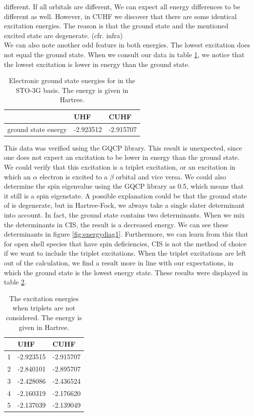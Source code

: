different. If all orbitals are different, We can expect all energy differences to be different as well. However, in CUHF we discover that there are some identical
excitation energies. The reason is that the ground state and the mentioned excited state are degenerate. (cfr. infra)\\
We can also note another odd feature in both energies. The lowest excitation does not equal the ground state. When we consult our data in table
\ref{tab:ground states}, we notice that the lowest excitation is lower in energy than the ground state.
\begin{table}[H]
  \caption{Electronic ground state energies for  in the STO-3G basis. The energy is given in Hartree.}
  \label{tab:ground states}
  \begin{tabular}{l|l|l}
                        & UHF       & CUHF      \\
    \hline
    ground state energy & -2.923512 & -2.915707
  \end{tabular}
\end{table}
This data was verified using the GQCP library. This result is unexpected, since one does not expect an excitation to be lower in energy than the ground state. We could verify that
this excitation is a triplet excitation, or an excitation in which an $\alpha$ electron is excited to a $\beta$ orbital and vice versa. We could also determine the spin eigenvalue using
the GQCP library as 0.5, which means that it still is a spin eigenstate. A possible explanation could be that the ground state of  is degenerate, but in Hartree-Fock, we always 
take a single slater determinant into account. In fact, the ground state contains two determinants. When we mix the determinants in CIS, the result is a decreased energy.  
We can see these determinants in figure \ref{fig:energydiag1}. Furthermore, we can learn from this that for open shell species that have spin
deficiencies, CIS is not the method of choice if we want to include the triplet excitations. When the triplet excitations are left out of the calculation, we find a result more
in line with our expectations, in which the ground state is the lowest energy state. These results were displayed in table \ref{tab:excits_no_triplets}.\\
\begin{table}[H]
  \caption{The excitation energies when triplets are not considered. The energy is given in Hartree.}
  \label{tab:excits_no_triplets}
  \begin{tabular}{l|l|l}
      & UHF       & CUHF      \\
    \hline
    1 & -2.923515 & -2.915707 \\
    2 & -2.840101 & -2.895707 \\
    3 & -2.428086 & -2.436524 \\
    4 & -2.160319 & -2.176620 \\
    5 & -2.137039 & -2.139049
  \end{tabular}
\end{table}

